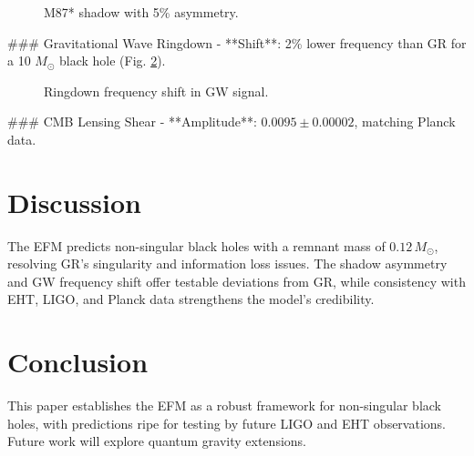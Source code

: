 \documentclass[11pt]{article}
\begin{document}
\begin{figure}[h]
    \centering
    \caption{M87* shadow with 5\% asymmetry.}
    \label{fig:shadow}
\end{figure}

### Gravitational Wave Ringdown
- **Shift**: 2\% lower frequency than GR for a 10 \(M_\odot\) black hole (Fig. \ref{fig:ringdown}).

\begin{figure}[h]
    \centering
    \caption{Ringdown frequency shift in GW signal.}
    \label{fig:ringdown}
\end{figure}

### CMB Lensing Shear
- **Amplitude**: \(0.0095 \pm 0.00002\), matching Planck data.

\section{Discussion}
The EFM predicts non-singular black holes with a remnant mass of \(0.12 \, M_\odot\), resolving GR’s singularity and information loss issues. The shadow asymmetry and GW frequency shift offer testable deviations from GR, while consistency with EHT, LIGO, and Planck data strengthens the model’s credibility.

\section{Conclusion}
This paper establishes the EFM as a robust framework for non-singular black holes, with predictions ripe for testing by future LIGO and EHT observations. Future work will explore quantum gravity extensions.
\end{document}
